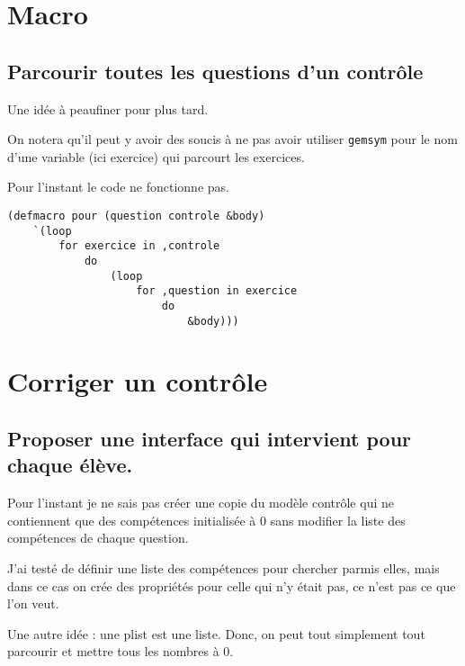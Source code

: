 \documentclass[a4paper, 11pt, DIV=18]{scrartcl}
\begin{document}
\section{Macro}
\label{sec:org7e40b86}

\subsection{Parcourir toutes les questions d'un contrôle}
\label{sec:org6fde32e}

Une idée à peaufiner pour plus tard.

On notera qu'il peut y avoir des soucis à ne pas avoir utiliser \texttt{gemsym} pour le
nom d'une variable (ici exercice) qui parcourt les exercices.

Pour l'instant le code ne fonctionne pas.
\begin{verbatim}
(defmacro pour (question controle &body)
    `(loop
        for exercice in ,controle
            do
                (loop
                    for ,question in exercice
                        do
                            &body)))
\end{verbatim}

\section{Corriger un contrôle}
\label{sec:org2e7f481}

\subsection{Proposer une interface qui intervient pour chaque élève.}
\label{sec:orgdad4d98}

Pour l'instant je ne sais pas créer une copie du modèle contrôle qui ne
contiennent que des compétences initialisée à \(0\) sans modifier la liste des
compétences de chaque question.

J'ai testé de définir une liste des compétences pour chercher parmis elles, mais
dans ce cas on crée des propriétés pour celle qui n'y était pas, ce n'est pas ce
que l'on veut.

Une autre idée : une plist est une liste. Donc, on peut tout simplement tout
parcourir et mettre tous les nombres à 0.
\end{document}

